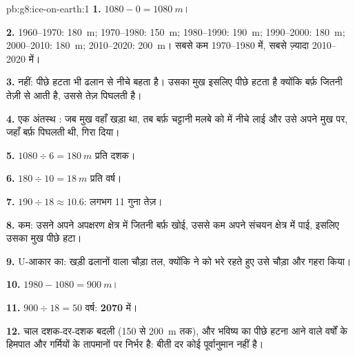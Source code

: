 \begin{solution}{pb:g8:ice-on-earth:1}
\textbf{1.} $1080 - 0 = \qty{1080}{m}$।

\textbf{2.} 1960--1970: \qty{180}{m}; 1970--1980: \qty{150}{m};
1980--1990: \qty{190}{m}; 1990--2000: \qty{180}{m}; 2000--2010:
\qty{180}{m}; 2010--2020: \qty{200}{m}। सबसे कम 1970--1980 में, सबसे ज़्यादा
2010--2020 में।

\textbf{3.} नहीं: पीछे हटता  भी ढलान से नीचे बहता है। उसका मुख इसलिए पीछे
हटता है क्योंकि बर्फ़ जितनी तेज़ी से आती है, उससे तेज़ पिघलती है।

\textbf{4.} एक अंतस्थ : जब मुख वहाँ खड़ा था, तब बर्फ़ चट्टानी मलबे को  में नीचे
लाई और उसे अपने मुख पर, जहाँ बर्फ़ पिघलती थी, गिरा दिया।

\textbf{5.} $1080 \div 6 = \qty{180}{m}$ प्रति दशक।

\textbf{6.} $180 \div 10 = \qty{18}{m}$ प्रति वर्ष।

\textbf{7.} $190 \div 18 \approx 10.6$: लगभग 11 गुना तेज़।

\textbf{8.} कम: उसने अपने अपक्षरण क्षेत्र में जितनी बर्फ़ खोई, उससे कम अपने संचयन क्षेत्र
में पाई, इसलिए उसका मुख पीछे हटा।

\textbf{9.} U-आकार का: खड़ी ढलानों वाला चौड़ा तल, क्योंकि  ने  को भरे रहते हुए
उसे चौड़ा और गहरा किया।

\textbf{10.} $1980 - 1080 = \qty{900}{m}$।

\textbf{11.} $900 \div 18 = 50$ वर्ष: \textbf{2070} में।

\textbf{12.} चाल दशक-दर-दशक बदली (150 से \qty{200}{m} तक), और भविष्य का पीछे हटना
आने वाले वर्षों के हिमपात और गर्मियों के तापमानों पर निर्भर है: बीती दर कोई पूर्वानुमान
नहीं है।
\end{solution}
